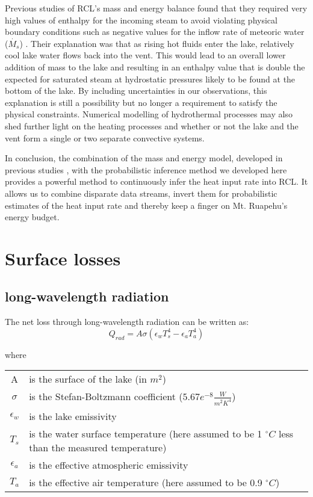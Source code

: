 \documentclass[doublespacing, linenumbers]{bmcart}
\begin{document}
Previous studies of RCL's mass and energy balance found that they required very
high values of enthalpy for the incoming steam to avoid violating physical
boundary conditions such as negative values for the inflow rate of meteoric
water ($\dot{M_s}$) \cite{Hurst1991, hurstCraterLakeEnergy2015}. Their
explanation was that as rising hot fluids enter the lake, relatively cool lake
water flows back into the vent. This would lead to an overall lower addition of
mass to the lake and resulting in an enthalpy value that is double the expected
for saturated steam at hydrostatic pressures likely to be found at the bottom of
the lake. By including uncertainties in our observations, this explanation is
still a possibility but no longer a requirement to satisfy the physical
constraints. Numerical modelling of hydrothermal processes may also shed further
light on the heating processes and whether or not the lake and the vent form a
single or two separate convective systems.

In conclusion, the combination of the mass and energy model, developed in
previous studies \cite{Hurst1991,hurstCraterLakeEnergy2015}, with the
probabilistic inference method we developed here provides a powerful method to
continuously infer the heat input rate into RCL. It allows us to combine
disparate data streams, invert them for probabilistic estimates of the heat
input rate and thereby keep a finger on Mt. Ruapehu's energy budget.

\appendix
\section{Surface losses}\label{A}
\subsection{long-wavelength radiation}
The net loss through long-wavelength radiation can be written as:
\begin{equation}
    Q_{rad} = A\sigma(\epsilon_w T_s^4 - \epsilon_a T_a^4)
\end{equation}

where
\begin{table}[h!]
\begin{tabular}{cp{8cm}}
    A & is the surface of the lake (in $m^2$) \\
    $\sigma$ & is the Stefan-Boltzmann coefficient ($5.67e^{-8} \frac{W}{m^2 K^4}$) \\
    $\epsilon_w$ & is the lake emissivity \\
    $T_s$ & is the water surface temperature (here assumed to be 1 $^{\circ}C$ less than the
    measured temperature) \\
    $\epsilon_a$ & is the effective atmospheric emissivity \\
    $T_a$ & is the effective air temperature (here assumed to be 0.9 $^{\circ}C$) \\ 
\end{tabular}
\end{table}
\end{document}
